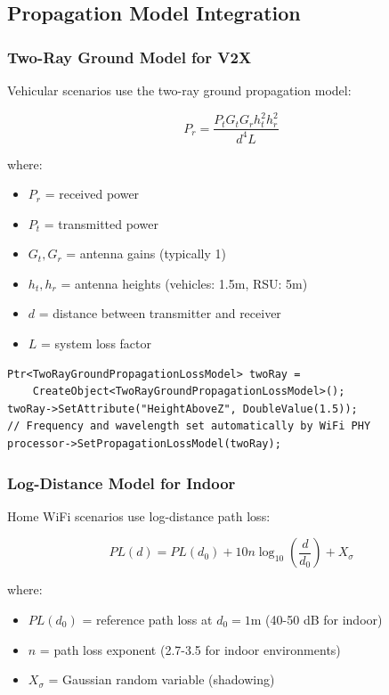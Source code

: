 \subsection{Propagation Model Integration}

\subsubsection{Two-Ray Ground Model for V2X}

Vehicular scenarios use the two-ray ground propagation model:

\begin{equation}
P_r = \frac{P_t G_t G_r h_t^2 h_r^2}{d^4 L}
\end{equation}

where:
\begin{itemize}
    \item $P_r$ = received power
    \item $P_t$ = transmitted power
    \item $G_t, G_r$ = antenna gains (typically 1)
    \item $h_t, h_r$ = antenna heights (vehicles: 1.5m, RSU: 5m)
    \item $d$ = distance between transmitter and receiver
    \item $L$ = system loss factor
\end{itemize}

\begin{lstlisting}[style=cpp, caption={Two-ray ground model configuration}]
Ptr<TwoRayGroundPropagationLossModel> twoRay = 
    CreateObject<TwoRayGroundPropagationLossModel>();
twoRay->SetAttribute("HeightAboveZ", DoubleValue(1.5));
// Frequency and wavelength set automatically by WiFi PHY
processor->SetPropagationLossModel(twoRay);
\end{lstlisting}

\subsubsection{Log-Distance Model for Indoor}

Home WiFi scenarios use log-distance path loss:

\begin{equation}
PL(d) = PL(d_0) + 10 n \log_{10}\left(\frac{d}{d_0}\right) + X_\sigma
\end{equation}

where:
\begin{itemize}
    \item $PL(d_0)$ = reference path loss at $d_0 = 1$m (40-50 dB for indoor)
    \item $n$ = path loss exponent (2.7-3.5 for indoor environments)
    \item $X_\sigma$ = Gaussian random variable (shadowing)
\end{itemize}

